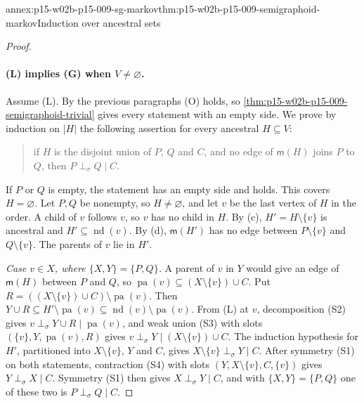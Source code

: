 \begin{annexitem}{annex:p15-w02b-p15-009-sg-markov}{thm:p15-w02b-p15-009-semigraphoid-markov}{Induction over ancestral sets}
\begin{proof}
\paragraph{(L) implies (G) when \(V\neq\varnothing\).}
Assume (L). By the previous paragraphs (O) holds, so
\cref{thm:p15-w02b-p15-009-semigraphoid-trivial} gives every statement
with an empty side. We prove by induction on \(|H|\) the following
assertion for every ancestral \(H\subseteq V\):
\begin{quote}
if \(H\) is the disjoint union of \(P\), \(Q\) and \(C\), and no edge
of \(\mathsf m(H)\) joins \(P\) to \(Q\), then \(P\perp_\sigma Q\mid C\).
\end{quote}
If \(P\) or \(Q\) is empty, the statement has an empty side and holds.
This covers \(H=\varnothing\). Let \(P,Q\) be nonempty, so
\(H\neq\varnothing\), and let \(v\) be the last vertex of \(H\) in the
order. A child of \(v\) follows \(v\), so \(v\) has no child in \(H\).
By (c), \(H'=H\setminus\{v\}\) is ancestral and
\(H'\subseteq\operatorname{nd}(v)\). By (d), \(\mathsf m(H')\) has no
edge between \(P\setminus\{v\}\) and \(Q\setminus\{v\}\). The parents
of \(v\) lie in \(H'\).

\emph{Case \(v\in X\), where \(\{X,Y\}=\{P,Q\}\).} A parent of \(v\) in
\(Y\) would give an edge of \(\mathsf m(H)\) between \(P\) and \(Q\),
so \(\operatorname{pa}(v)\subseteq(X\setminus\{v\})\cup C\). Put
\(R=((X\setminus\{v\})\cup C)\setminus\operatorname{pa}(v)\). Then
\(Y\cup R\subseteq H'\setminus\operatorname{pa}(v)
\subseteq\operatorname{nd}(v)\setminus\operatorname{pa}(v)\).
From (L) at \(v\), decomposition (S2) gives
\(v\perp_\sigma Y\cup R\mid\operatorname{pa}(v)\), and weak union (S3)
with slots \((\{v\},Y,\operatorname{pa}(v),R)\) gives
\(v\perp_\sigma Y\mid(X\setminus\{v\})\cup C\). The induction
hypothesis for \(H'\), partitioned into \(X\setminus\{v\}\), \(Y\) and
\(C\), gives \(X\setminus\{v\}\perp_\sigma Y\mid C\). After symmetry
(S1) on both statements, contraction (S4) with slots
\((Y,X\setminus\{v\},C,\{v\})\) gives \(Y\perp_\sigma X\mid C\).
Symmetry (S1) then gives \(X\perp_\sigma Y\mid C\), and with
\(\{X,Y\}=\{P,Q\}\) one of these two is \(P\perp_\sigma Q\mid C\).


\end{proof}
\end{annexitem}
